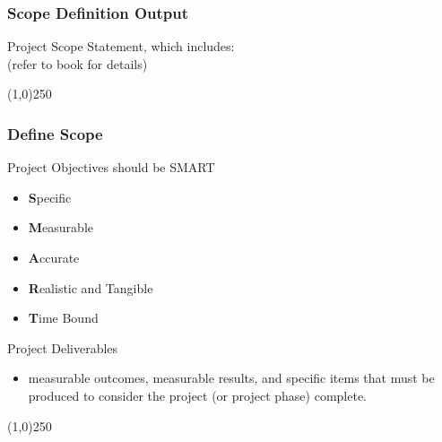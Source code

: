 \begin{frame}
\frametitle{Scope Definition \hfill Output}
Project Scope Statement, which includes:\\ 
(refer to book for details) 

\begin{table}
\end{table}

\end{frame}\begin{center}\line(1,0){250}\end{center}



\begin{frame}
\frametitle{Define Scope}
Project Objectives should be SMART
\begin{itemize}
	\item \textbf{S}pecific
	\item \textbf{M}easurable
	\item \textbf{A}ccurate
	\item \textbf{R}ealistic and Tangible
	\item \textbf{T}ime Bound
\end{itemize}
Project Deliverables  
\begin{itemize}
	\item measurable outcomes, measurable results, and specific items that must be produced to consider the project (or project phase) complete. 
\end{itemize}
\end{frame}\begin{center}\line(1,0){250}\end{center}



